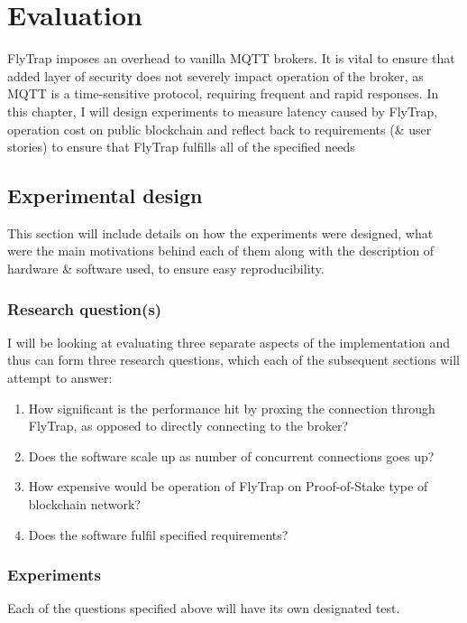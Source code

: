 \chapter{Evaluation}\label{chap:evaluation}
FlyTrap imposes an overhead to vanilla MQTT brokers. It is vital to ensure that added layer of security does not severely impact operation of the broker, as MQTT is a time-sensitive protocol, requiring frequent and rapid responses. In this chapter, I will design experiments to measure latency caused by FlyTrap, operation cost on public blockchain and reflect back to requirements (\& user stories) to ensure that FlyTrap fulfills all of the specified needs

\section{Experimental design}
This section will include details on how the experiments were designed, what were the main motivations behind each of them along with the description of hardware \& software used, to ensure easy reproducibility.
\subsection{Research question(s)}
I will be looking at evaluating three separate aspects of the implementation and thus can form three research questions, which each of the subsequent sections will attempt to answer:
\begin{enumerate}
  \item How significant is the performance hit by proxing the connection through FlyTrap, as opposed to directly connecting to the broker?
  \item Does the software scale up as number of concurrent connections goes up?
  \item How expensive would be operation of FlyTrap on Proof-of-Stake type of blockchain network?
  \item Does the software fulfil specified requirements?
\end{enumerate}
\subsection{Experiments}
Each of the questions specified above will have its own designated test.

